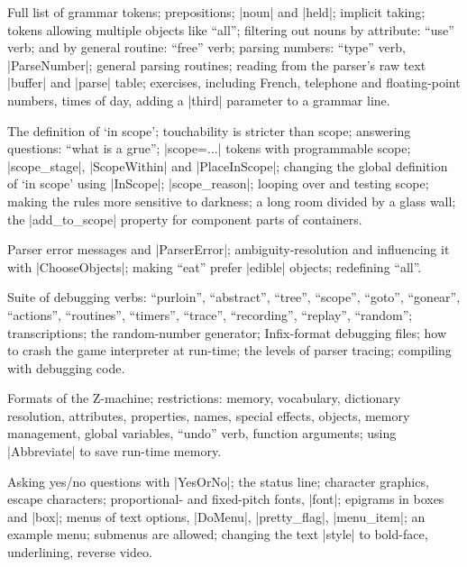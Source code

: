 %
Full list of grammar tokens; prepositions; |noun| and |held|; implicit
taking; tokens allowing multiple objects like ``all''; filtering out nouns
by attribute: ``use'' verb; and by general routine: ``free'' verb; parsing
numbers: ``type'' verb, |ParseNumber|; general parsing routines; reading
from the parser's raw text |buffer| and |parse| table; exercises, including
French, telephone and floating-point numbers, times of day, adding a
|third| parameter to a grammar line.

%
The definition of `in scope'; touchability is stricter than scope;
answering questions: ``what is a grue''; |scope=...| tokens with
programmable scope; |scope_stage|, |ScopeWithin| and |PlaceInScope|;
changing the global definition of `in scope' using |InScope|;
|scope_reason|; looping over and testing scope; making the rules more
sensitive to darkness; a long room divided by a glass wall; the
|add_to_scope| property for component parts of containers.

%
Parser error messages and |ParserError|; ambiguity-resolution and
influencing it with |ChooseObjects|; making ``eat'' prefer |edible|
objects; redefining ``all''.

\vfill\eject
{}

%
Suite of debugging verbs: ``purloin'', ``abstract'', ``tree'', ``scope'',
``goto'', ``gonear'', ``actions'', ``routines'', ``timers'', ``trace'',
``recording'', ``replay'', ``random''; transcriptions; the random-number
generator; Infix-format debugging files; how to crash the game interpreter
at run-time; the levels of parser tracing; compiling with debugging code.

%
Formats of the Z-machine; restrictions: memory, vocabulary, dictionary
resolution, attributes, properties, names, special effects, objects, memory
management, global variables, ``undo'' verb, function arguments; using
|Abbreviate| to save run-time memory.

%
Asking yes/no questions with |YesOrNo|; the status line; character graphics,
escape characters; proportional- and fixed-pitch fonts, |font|; epigrams in
boxes and |box|; menus of text options, |DoMenu|, |pretty_flag|,
|menu_item|; an example menu; submenus are allowed; changing the text
|style| to bold-face, underlining, reverse video.

